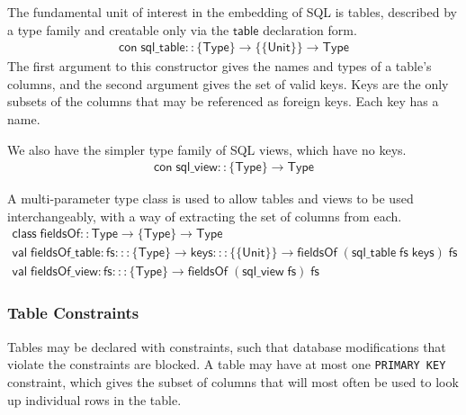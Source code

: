 \documentclass{article}
\newcommand{\mt}[1]{\mathsf{#1}}
\begin{document}
The fundamental unit of interest in the embedding of SQL is tables, described by a type family and creatable only via the $\mt{table}$ declaration form.
$$\begin{array}{l}
  \mt{con} \; \mt{sql\_table} :: \{\mt{Type}\} \to \{\{\mt{Unit}\}\} \to \mt{Type}
\end{array}$$
The first argument to this constructor gives the names and types of a table's columns, and the second argument gives the set of valid keys.  Keys are the only subsets of the columns that may be referenced as foreign keys.  Each key has a name.

We also have the simpler type family of SQL views, which have no keys.
$$\begin{array}{l}
  \mt{con} \; \mt{sql\_view} :: \{\mt{Type}\} \to \mt{Type}
\end{array}$$

A multi-parameter type class is used to allow tables and views to be used interchangeably, with a way of extracting the set of columns from each.
$$\begin{array}{l}
  \mt{class} \; \mt{fieldsOf} :: \mt{Type} \to \{\mt{Type}\} \to \mt{Type} \\
  \mt{val} \; \mt{fieldsOf\_table} : \mt{fs} ::: \{\mt{Type}\} \to \mt{keys} ::: \{\{\mt{Unit}\}\} \to \mt{fieldsOf} \; (\mt{sql\_table} \; \mt{fs} \; \mt{keys}) \; \mt{fs} \\
  \mt{val} \; \mt{fieldsOf\_view} : \mt{fs} ::: \{\mt{Type}\} \to \mt{fieldsOf} \; (\mt{sql\_view} \; \mt{fs}) \; \mt{fs}
\end{array}$$

\subsubsection{Table Constraints}

Tables may be declared with constraints, such that database modifications that violate the constraints are blocked.  A table may have at most one \texttt{PRIMARY KEY} constraint, which gives the subset of columns that will most often be used to look up individual rows in the table.
\end{document}

